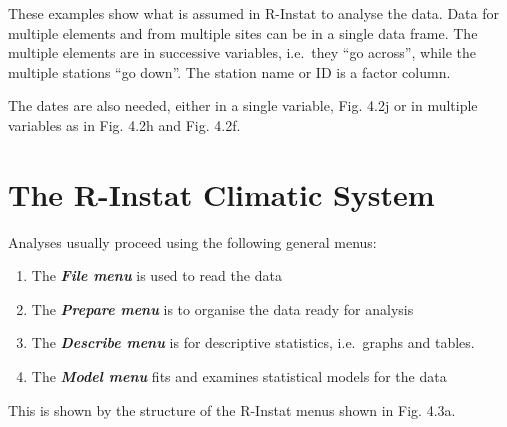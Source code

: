 \documentclass[
  letterpaper,
  DIV=11,
  numbers=noendperiod]{scrreprt}
\begin{document}
These examples show what is assumed in R-Instat to analyse the data.
Data for multiple elements and from multiple sites can be in a single
data frame. The multiple elements are in successive variables, i.e.~they
``go across'', while the multiple stations ``go down''. The station name
or ID is a factor column.

The dates are also needed, either in a single variable, Fig. 4.2j or in
multiple variables as in Fig. 4.2h and Fig. 4.2f.

\section{The R-Instat Climatic
System}\label{the-r-instat-climatic-system}

Analyses usually proceed using the following general menus:

\begin{enumerate}
\def\labelenumi{\arabic{enumi}.}
\item
  The \textbf{\emph{File menu}} is used to read the data
\item
  The \textbf{\emph{Prepare menu}} is to organise the data ready for
  analysis
\item
  The \textbf{\emph{Describe menu}} is for descriptive statistics,
  i.e.~graphs and tables.
\item
  The \textbf{\emph{Model menu}} fits and examines statistical models
  for the data
\end{enumerate}

This is shown by the structure of the R-Instat menus shown in Fig. 4.3a.
\end{document}
